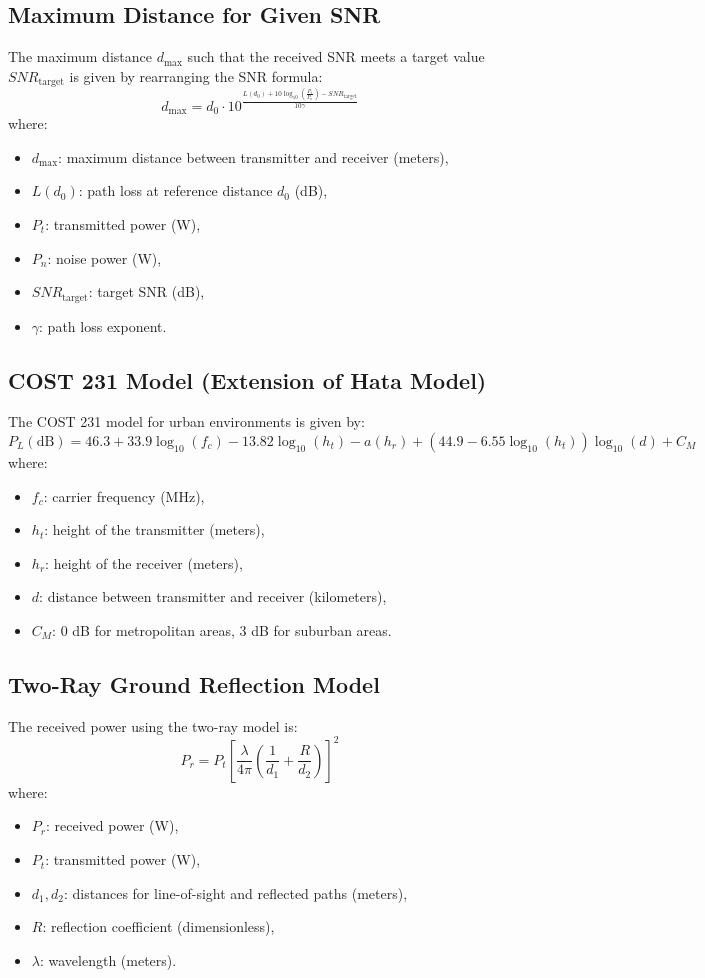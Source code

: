 \documentclass[a4paper,12pt]{book}
\begin{document}
	\subsection{Maximum Distance for Given SNR}
	The maximum distance \(d_{\text{max}}\) such that the received SNR meets a target value \(SNR_{\text{target}}\) is given by rearranging the SNR formula:
	\[
	d_{\text{max}} = d_0 \cdot 10^{\frac{L(d_0) + 10 \log_{10} \left( \frac{P_t}{P_n} \right) - SNR_{\text{target}}}{10 \gamma}}
	\]
	where:
	\begin{itemize}
		\item \( d_{\text{max}} \): maximum distance between transmitter and receiver (meters),
		\item \( L(d_0) \): path loss at reference distance \(d_0\) (dB),
		\item \( P_t \): transmitted power (W),
		\item \( P_n \): noise power (W),
		\item \( SNR_{\text{target}} \): target SNR (dB),
		\item \( \gamma \): path loss exponent.
	\end{itemize}
	
	\subsection{COST 231 Model (Extension of Hata Model)}
	The COST 231 model for urban environments is given by:
	\[
	P_L(\text{dB}) = 46.3 + 33.9 \log_{10}(f_c) - 13.82 \log_{10}(h_t) - a(h_r) + \left( 44.9 - 6.55 \log_{10}(h_t) \right) \log_{10}(d) + C_M
	\]
	where:
	\begin{itemize}
		\item \( f_c \): carrier frequency (MHz),
		\item \( h_t \): height of the transmitter (meters),
		\item \( h_r \): height of the receiver (meters),
		\item \( d \): distance between transmitter and receiver (kilometers),
		\item \( C_M \): 0 dB for metropolitan areas, 3 dB for suburban areas.
	\end{itemize}
	
	\subsection{Two-Ray Ground Reflection Model}
	The received power using the two-ray model is:
	\[
	P_r = P_t \left[ \frac{\lambda}{4 \pi} \left( \frac{1}{d_1} + \frac{R}{d_2} \right) \right]^2
	\]
	where:
	\begin{itemize}
		\item \( P_r \): received power (W),
		\item \( P_t \): transmitted power (W),
		\item \( d_1, d_2 \): distances for line-of-sight and reflected paths (meters),
		\item \( R \): reflection coefficient (dimensionless),
		\item \( \lambda \): wavelength (meters).
	\end{itemize}
	
\end{document}
